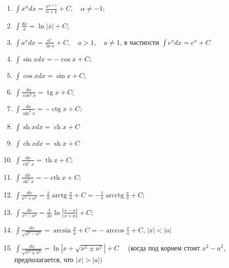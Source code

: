 \documentclass[10pt]{article}
\begin{document}
\begin{enumerate}

  \item $\int x^{\alpha} d x=\frac{x^{\alpha+1}}{\alpha+1}+C, \quad \alpha \neq-1$;



  \item $\int \frac{d x}{x}=\ln |x|+C$;



  \item $\int a^{x} d x=\frac{a^{x}}{\ln a}+C, \quad a>1, \quad a \neq 1$, в частности $\int e^{x} d x=e^{x}+C$



  \item $\int \sin x d x=-\cos x+C$;



  \item $\int \cos x d x=\sin x+C$;



  \item $\int \frac{d x}{\cos ^{2} x}=\operatorname{tg} x+C$;



  \item $\int \frac{d x}{\sin ^{2} x}=-\operatorname{ctg} x+C$;



  \item $\int \operatorname{sh} x d x=\operatorname{ch} x+C$



  \item $\int \operatorname{ch} x d x=\operatorname{sh} x+C$



  \item $\int \frac{d x}{\operatorname{ch}^{2} x}=\operatorname{th} x+C$;



  \item $\int \frac{d x}{\operatorname{sh}^{2} x}=-\operatorname{cth} x+C$;



  \item $\int \frac{d x}{x^{2}+a^{2}}=\frac{1}{a} \operatorname{arctg} \frac{x}{a}+C=-\frac{1}{a} \operatorname{arcctg} \frac{x}{a}+C$;



  \item $\int \frac{d x}{x^{2}-a^{2}}=\frac{1}{2 a} \ln \left|\frac{x-a}{x+a}\right|+C$;



  \item $\int \frac{d x}{\sqrt{a^{2}-x^{2}}}=\arcsin \frac{x}{a}+C=-\arccos \frac{x}{a}+C$, $|x|<|a|$



  \item $\int \frac{d x}{\sqrt{x^{2} \pm a^{2}}}=\ln \left|x+\sqrt{x^{2} \pm a^{2}}\right|+C \quad$ (когда под корнем стоит $x^{2}-a^{2}$, предполагается, что $|x|>|a|)$



\end{enumerate}
\end{document}
